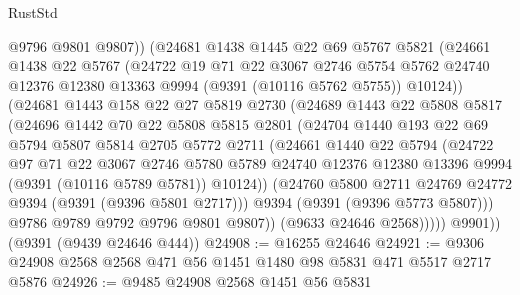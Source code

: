 \begin{lexlean}{RustStd}
\begin{coremodule}
                @9796
                @9801
                @9807))
            (@24681
              @1438
              @1445
              @22
              @69
              @5767
              @5821
              (@24661
                @1438
                @22
                @5767
                (@24722
                  @19
                  @71
                  @22
                  @3067
                  @2746
                  @5754
                  @5762
                  @24740
                  @12376
                  @12380
                  @13363
                  @9994
                  (@9391 (@10116 @5762 @5755))
                  @10124))
              (@24681
                @1443
                @158
                @22
                @27
                @5819
                @2730
                (@24689
                  @1443
                  @22
                  @5808
                  @5817
                  (@24696
                    @1442
                    @70
                    @22
                    @5808
                    @5815
                    @2801
                    (@24704
                      @1440
                      @193
                      @22
                      @69
                      @5794
                      @5807
                      @5814
                      @2705
                      @5772
                      @2711
                      (@24661
                        @1440
                        @22
                        @5794
                        (@24722
                          @97
                          @71
                          @22
                          @3067
                          @2746
                          @5780
                          @5789
                          @24740
                          @12376
                          @12380
                          @13396
                          @9994
                          (@9391 (@10116 @5789 @5781))
                          @10124))
                      (@24760 @5800 @2711 @24769 @24772 @9394 (@9391 (@9396 @5801 @2717)))
                      @9394
                      (@9391 (@9396 @5773 @5807)))
                    @9786
                    @9789
                    @9792
                    @9796
                    @9801
                    @9807))
                (@9633 @24646 @2568)))))
        @9901))
    (@9391 (@9439 @24646 @444))
@24908 := @16255 @24646
@24921 := @9306 @24908 @2568 @2568 @471 @56 @1451 @1480 @98 @5831 @471 @5517 @2717 @5876
@24926 := @9485 @24908 @2568 @1451 @56 @5831

\end{coremodule}
\end{lexlean}
